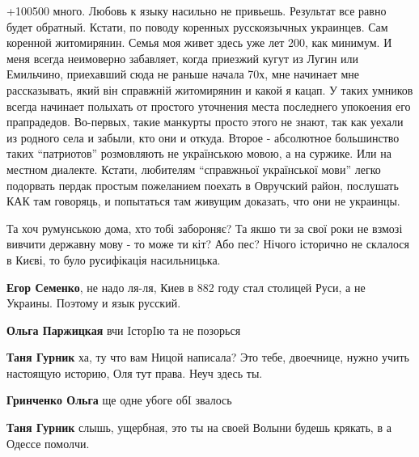 \begin{itemize}

+100500 много. Любовь к языку насильно не привьешь. Результат все равно будет
обратный. Кстати, по поводу коренных русскоязычных украинцев. Сам коренной
житомирянин. Семья моя живет здесь уже лет 200, как минимум. И меня всегда
неимоверно забавляет, когда приезжий кугут из Лугин или Емильчино, приехавший
сюда не раньше начала 70х, мне начинает мне рассказывать, який він справжній
житомирянин и какой я кацап. У таких умников всегда начинает полыхать от
простого уточнения места последнего упокоения его прапрадедов. Во-первых, такие
манкурты просто этого не знают, так как уехали из родного села и забыли, кто
они и откуда. Второе - абсолютное большинство таких \enquote{патриотов} розмовляють не
українською мовою, а на суржике. Или на местном диалекте. Кстати, любителям
\enquote{справжньої української мови} легко подорвать пердак простым пожеланием поехать
в Овручский район, послушать КАК там говоряць, и попытаться там живущим
доказать, что они не украинцы.


Та хоч румунською дома, хто тобі забороняє? Та якшо ти за свої роки не взмозі
вивчити державну мову - то може ти кіт? Або пес? Нічого історично не склалося в
Києві, то було русифікація насильницька.

\begin{itemize}
\textbf{Егор Семенко}, не надо ля-ля, Киев в 882 году стал столицей Руси, а не Украины. Поэтому и язык русский.

\textbf{Ольга Паржицкая} вчи IсторIю та не позорься

\textbf{Таня Гурник} ха, ту что вам Ницой написала? Это тебе, двоечнице, нужно учить настоящую историю, Оля тут права. Неуч здесь ты.

\textbf{Гринченко Ольга} ще одне убоге обI звалось

\textbf{Таня Гурник} слышь, ущербная, это ты на своей Волыни будешь крякать, в а Одессе помолчи.


\end{itemize}
\end{itemize}
